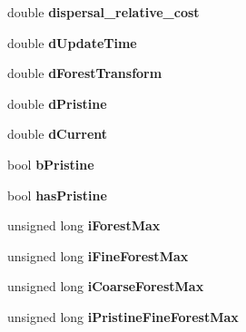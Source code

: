 \begin{DoxyCompactItemize}
\item 
double {\bfseries dispersal\+\_\+relative\+\_\+cost}\hypertarget{class_map_aeb8e8114c1bfa253379098978b50f603}{}\label{class_map_aeb8e8114c1bfa253379098978b50f603}

\item 
double {\bfseries d\+Update\+Time}\hypertarget{class_map_a7a06ca1a975e17055e41e31c33fc94e8}{}\label{class_map_a7a06ca1a975e17055e41e31c33fc94e8}

\item 
double {\bfseries d\+Forest\+Transform}\hypertarget{class_map_a254ad38e48e101cda7b6db9c05e500be}{}\label{class_map_a254ad38e48e101cda7b6db9c05e500be}

\item 
double {\bfseries d\+Pristine}\hypertarget{class_map_ad1922124162d60a7711bbfec5675d7b6}{}\label{class_map_ad1922124162d60a7711bbfec5675d7b6}

\item 
double {\bfseries d\+Current}\hypertarget{class_map_aa059ee6240b877c73449079e143cc315}{}\label{class_map_aa059ee6240b877c73449079e143cc315}

\item 
bool {\bfseries b\+Pristine}\hypertarget{class_map_a2220e5d773e2ebc2ff4a6fa4155b3704}{}\label{class_map_a2220e5d773e2ebc2ff4a6fa4155b3704}

\item 
bool {\bfseries has\+Pristine}\hypertarget{class_map_aa5522cbe869fecb05f3289d497abb3f2}{}\label{class_map_aa5522cbe869fecb05f3289d497abb3f2}

\item 
unsigned long {\bfseries i\+Forest\+Max}\hypertarget{class_map_a8579e315f59b50a729ac229610c3b719}{}\label{class_map_a8579e315f59b50a729ac229610c3b719}

\item 
unsigned long {\bfseries i\+Fine\+Forest\+Max}\hypertarget{class_map_aaf1aa491a06c809e7ad7e03cdf1cc616}{}\label{class_map_aaf1aa491a06c809e7ad7e03cdf1cc616}

\item 
unsigned long {\bfseries i\+Coarse\+Forest\+Max}\hypertarget{class_map_aaff790d9eda0a99e0e7217af587bbae7}{}\label{class_map_aaff790d9eda0a99e0e7217af587bbae7}

\item 
unsigned long {\bfseries i\+Pristine\+Fine\+Forest\+Max}\hypertarget{class_map_add2abacf840d9daa1d3f5cc62902a188}{}\label{class_map_add2abacf840d9daa1d3f5cc62902a188}


\end{DoxyCompactItemize}
